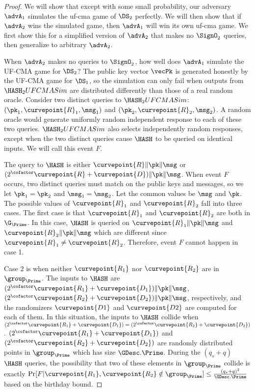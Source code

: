 \begin{proof}
		
		We will show that except with some small probability, our adversary $\advA_1$ simulates the uf-cma game of $\DS_2$ perfectly. We will then show that if $\advA_2$ wins the simulated game, then $\advA_1$ will win its own uf-cma game. We first show this for a simplified version of $\advA_2$ that makes no $\SignO_2$ queries, then generalize to arbitrary $\advA_2$. 
		
		When $\advA_2$ makes no queries to $\SignO_2$, how well does $\advA_1$ simulate the UF-CMA game for $\DS_2$? The public key vector $\vecPk$ is generated honestly by the UF-CMA game for $\DS_1$, so the simulation can only fail when outputs from $\HASH_2UFCMASim$ are distributed differently than those of a real random oracle. Consider two distinct queries to $\HASH_2UFCMASim$: $(\pk_1, \curvepoint{R}_1, \msg_1)$ and $(\pk_2, \curvepoint{R}_2, \msg_2)$. A random oracle would generate uniformly random independent response to each of these two queries. $\HASH_2UFCMASim$ also selects independently random responses, except when the two distinct queries cause $\HASH$ to be queried on identical inputs. We will call this event $F$. 
		
		The query to $\HASH$ is either $\curvepoint{R}\|\pk\|\msg$ or $(2^\cofactor\curvepoint{R} + \curvepoint{D})\|\pk\|\msg$. When event $F$ occurs, two distinct queries must match on the public keys and messages, so we let $\pk_1 = \pk_2$ and $\msg_1 = \msg_2$. Let the common values be $\msg$ and $\pk$. The possible values of $\curvepoint{R}_1$ and $\curvepoint{R}_2$ fall into three cases. The first case is that $\curvepoint{R}_1$ and $\curvepoint{R}_2$ are both in $\G_\Prime$. In this case, $\HASH$ is queried on $\curvepoint{R}_1\|\pk\|\msg$ and $\curvepoint{R}_2\|\pk\|\msg$ which are different since $\curvepoint{R}_1 \neq \curvepoint{R}_2$. Therefore, event $F$ cannot happen in case 1. 
		
		Case 2 is when neither $\curvepoint{R_1}$ nor $\curvepoint{R_2}$ are  in $\group_{\Prime}$. The inputs to $\HASH$ are $(2^\cofactor\curvepoint{R_1} + \curvepoint{D_1})\|\pk\|\msg$, 
		$(2^\cofactor\curvepoint{R_2} + \curvepoint{D_2})\|\pk\|\msg$, respectively, and the randomizers $\curvepoint{D1}$ and $\curvepoint{D2}$ are computed for each of them. In this situation, the inputs to $\HASH$ collide when $(2^\cofactor\curvepoint{R_1} + \curvepoint{D_1}) = (2^\cofactor\curvepoint{R_2} + \curvepoint{D_2})$. $(2^\cofactor\curvepoint{R_1} + \curvepoint{D_1})$ and $(2^\cofactor\curvepoint{R_2} + \curvepoint{D_2})$ are randomly distributed points in $\group_{\Prime}$ which has size $\GDesc.\Prime$. During the $(q_s + q)$ $\HASH$ queries, the possibility that two of these elements in $\group_{\Prime}$ collide is exactly $\Pr[F | \curvepoint{R_1}, \curvepoint{R_2} \notin \group_{\Prime}] \leq \frac{(q_s + q)^2}{\GDesc.\Prime}$ based on the birthday bound.
		

\end{proof}
